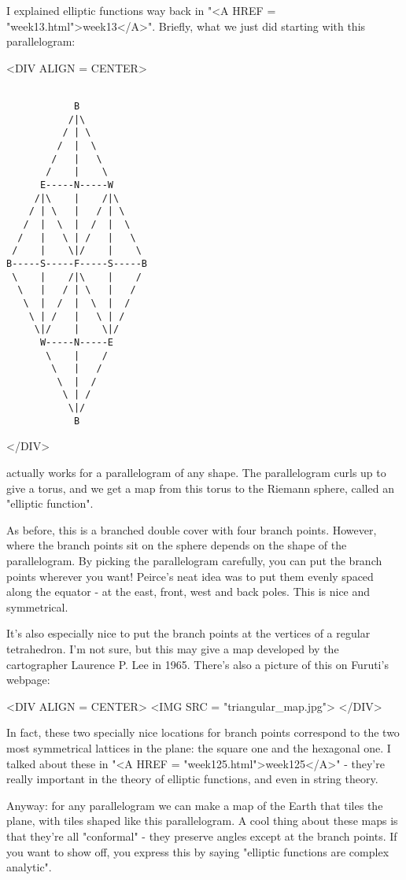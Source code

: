 I explained elliptic functions way back in 
"<A HREF = "week13.html">week13</A>".  Briefly,
what we just did starting with this parallelogram:

<DIV ALIGN = CENTER>

\begin{verbatim}

            B            
           /|\           
          / | \          
         /  |  \         
        /   |   \        
       /    |    \       
      E-----N-----W      
     /|\    |    /|\     
    / | \   |   / | \    
   /  |  \  |  /  |  \   
  /   |   \ | /   |   \  
 /    |    \|/    |    \ 
B-----S-----F-----S-----B
 \    |    /|\    |    / 
  \   |   / | \   |   /  
   \  |  /  |  \  |  /   
    \ | /   |   \ | /    
     \|/    |    \|/     
      W-----N-----E      
       \    |    /       
        \   |   /        
         \  |  /         
          \ | /          
           \|/           
            B            
\end{verbatim}
    
</DIV>

actually works for a parallelogram of any shape.  The parallelogram 
curls up to give a torus, and we get a map from this torus to the 
Riemann sphere, called an "elliptic function".  

As before, this is a branched double cover with four branch points.
However, where the branch points sit on the sphere depends on the
shape of the parallelogram.  By picking the parallelogram carefully,
you can put the branch points wherever you want!  Peirce's neat idea
was to put them evenly spaced along the equator - at the east, front, 
west and back poles.  This is nice and symmetrical.

It's also especially nice to put the branch points at the vertices 
of a regular tetrahedron.  I'm not sure, but this may give a map 
developed by the cartographer Laurence P. Lee in 1965.  There's also
a picture of this on Furuti's webpage:

<DIV ALIGN = CENTER>
<IMG SRC = "triangular_map.jpg">
</DIV>

In fact, these two specially nice locations for branch points 
correspond to the two most symmetrical lattices in the plane: 
the square one and the hexagonal one.  I talked about these in
"<A HREF = "week125.html">week125</A>" - they're really important in the theory of elliptic
functions, and even in string theory.

Anyway: for any parallelogram we can make a map of the Earth that 
tiles the plane, with tiles shaped like this parallelogram.   
A cool thing about these maps is that they're all "conformal" - 
they preserve angles except at the branch points.  If you want 
to show off, you express this by saying "elliptic functions are 
complex analytic".

